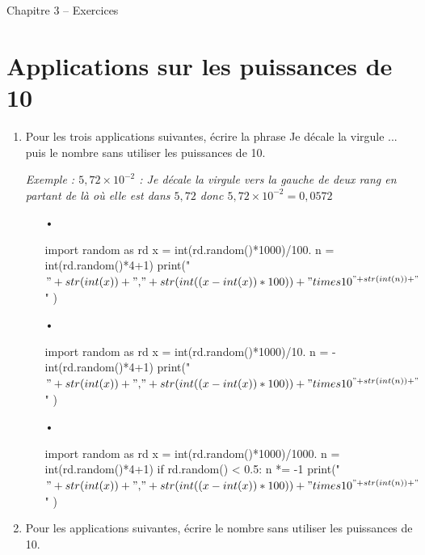 \documentclass[12pt,a4paper]{article}
\begin{document}
\begin{header}
Chapitre 3 -- Exercices
\end{header}

\section*{Applications sur les puissances de 10}

\begin{enumerate}
\item Pour les trois applications suivantes, écrire la phrase \og Je décale la virgule ... \fg{} puis le nombre sans utiliser les puissances de 10.

\textit{Exemple  : $5{,}72\times 10^{-2}$ : Je décale la virgule vers la gauche de deux rang en partant de là où elle est dans $5{,}72$ donc $5{,}72\times 10^{-2}=0{,}0572$}

\begin{multicols}{3}
\begin{enumerate}
\item[•]
\begin{pycode}
import random as rd
x = int(rd.random()*1000)/100.
n = int(rd.random()*4+1)
print("$" + str(int(x)) + "{,}" + str(int((x-int(x))*100)) + "\\times 10^{" + str(int(n)) + "}$" )
\end{pycode}

\item[•]
\begin{pycode}
import random as rd
x = int(rd.random()*1000)/10.
n = -int(rd.random()*4+1)
print("$" + str(int(x)) + "{,}" + str(int((x-int(x))*100)) + "\\times 10^{" + str(int(n)) + "}$" )
\end{pycode}

\item[•]
\begin{pycode}
import random as rd
x = int(rd.random()*1000)/1000.
n = int(rd.random()*4+1)
if rd.random() < 0.5:
    n *= -1
print("$" + str(int(x)) + "{,}" + str(int((x-int(x))*100)) + "\\times 10^{" + str(int(n)) + "}$" )
\end{pycode}
\end{enumerate}
\end{multicols}

\item Pour les applications suivantes, écrire le nombre sans utiliser les puissances de 10.
\begin{itemize}
\end{itemize}
\end{enumerate}
\end{document}
